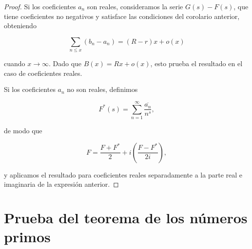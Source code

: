 \begin{proof}
Si los coeficientes $a_n$ son reales, consideramos la serie $G(s)-F(s)$, que tiene coeficientes no negativos y satisface las condiciones del corolario anterior, obteniendo

$$
\sum_{n \leq x}\left(b_n-a_n\right) = (R-r) x + o(x)
$$

cuando $x \to \infty$. Dado que $B(x) = R x + o(x)$, esto prueba el resultado en el caso de coeficientes reales.  

Si los coeficientes $a_n$ no son reales, definimos

$$
F^*(s) = \sum_{n=1}^{\infty} \frac{\overline{a_n}}{n^s},
$$

de modo que

$$
F = \frac{F + F^*}{2} + i\left(\frac{F - F^*}{2 i}\right),
$$

y aplicamos el resultado para coeficientes reales separadamente a la parte real e imaginaria de la expresión anterior.
\end{proof}


\section{Prueba del teorema de los números primos}